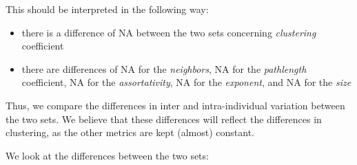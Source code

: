 \documentclass[
]{article}
\providecommand{\tightlist}{%
  \setlength{\itemsep}{0pt}\setlength{\parskip}{0pt}}
\begin{document}
This should be interpreted in the following way:

\begin{itemize}
\tightlist
\item
  there is a difference of NA between the two sets concerning
  \emph{clustering} coefficient
\item
  there are differences of NA for the \emph{neighbors}, NA for the
  \emph{pathlength} coefficient, NA for the \emph{assortativity}, NA for
  the \emph{exponent}, and NA for the \emph{size}
\end{itemize}

Thus, we compare the differences in inter and intra-individual variation
between the two sets. We believe that these differences will reflect the
differences in clustering, as the other metrics are kept (almost)
constant.

We look at the differences between the two sets:
\end{document}

